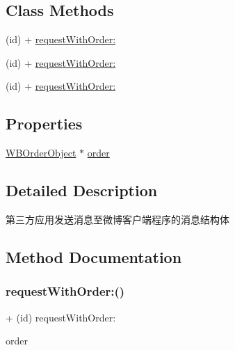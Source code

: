 \subsection*{Class Methods}
\begin{DoxyCompactItemize}
\item 
(id) + \mbox{\hyperlink{interface_w_b_payment_request_a52f05e2af96ca90661962e1b346135a6}{request\+With\+Order\+:}}
\item 
(id) + \mbox{\hyperlink{interface_w_b_payment_request_a52f05e2af96ca90661962e1b346135a6}{request\+With\+Order\+:}}
\item 
(id) + \mbox{\hyperlink{interface_w_b_payment_request_a52f05e2af96ca90661962e1b346135a6}{request\+With\+Order\+:}}
\end{DoxyCompactItemize}
\subsection*{Properties}
\begin{DoxyCompactItemize}
\item 
\mbox{\hyperlink{interface_w_b_order_object}{W\+B\+Order\+Object}} $\ast$ \mbox{\hyperlink{interface_w_b_payment_request_a20a30e6925133ce010e2f3b587b4117b}{order}}
\end{DoxyCompactItemize}


\subsection{Detailed Description}
第三方应用发送消息至微博客户端程序的消息结构体 

\subsection{Method Documentation}
\mbox{\label{interface_w_b_payment_request_a52f05e2af96ca90661962e1b346135a6}} 
\subsubsection{\texorpdfstring{request\+With\+Order\+:()}{requestWithOrder:()}\hspace{0.1cm}{\footnotesize\ttfamily [1/3]}}
{\footnotesize\ttfamily + (id) request\+With\+Order\+: \begin{DoxyParamCaption}\item[{(\mbox{\hyperlink{interface_w_b_order_object}{W\+B\+Order\+Object}} $\ast$)}]{order }\end{DoxyParamCaption}}

